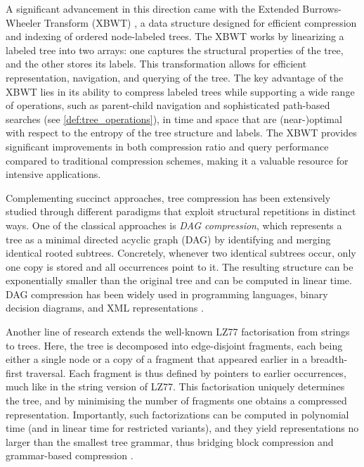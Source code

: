 A significant advancement in this direction came with the Extended Burrows-Wheeler Transform (XBWT) \cite{ferragina2009compressing}, a data structure designed for efficient compression and indexing of ordered node-labeled trees. The XBWT works by linearizing a labeled tree into two arrays: one captures the structural properties of the tree, and the other stores its labels. This transformation allows for efficient representation, navigation, and querying of the tree. The key advantage of the XBWT lies in its ability to compress labeled trees while supporting a wide range of operations, such as parent-child navigation and sophisticated path-based searches (see \cref{def:tree_operations}), in time and space that are (near-)optimal with respect to the entropy of the tree structure and labels. The XBWT provides significant improvements in both compression ratio and query performance compared to traditional compression schemes, making it a valuable resource for intensive applications.

Complementing succinct approaches, tree compression has been extensively studied through different paradigms that exploit structural repetitions in distinct ways. One of the classical approaches is \emph{DAG compression}, which represents a tree as a minimal directed acyclic graph (DAG) by identifying and merging identical rooted subtrees. Concretely, whenever two identical subtrees occur, only one copy is stored and all occurrences point to it. The resulting structure can be exponentially smaller than the original tree and can be computed in linear time. DAG compression has been widely used in programming languages, binary decision diagrams, and XML representations \cite{billeTreeCompressionTop2015}.

Another line of research extends the well-known LZ77 factorisation from strings to trees. Here, the tree is decomposed into edge-disjoint fragments, each being either a single node or a copy of a fragment that appeared earlier in a breadth-first traversal. Each fragment is thus defined by pointers to earlier occurrences, much like in the string version of LZ77. This factorisation uniquely determines the tree, and by minimising the number of fragments one obtains a compressed representation. Importantly, such factorizations can be computed in polynomial time (and in linear time for restricted variants), and they yield representations no larger than the smallest tree grammar, thus bridging block compression and grammar-based compression \cite{gawrychowskiLZ77FactorisationTrees2016}.

